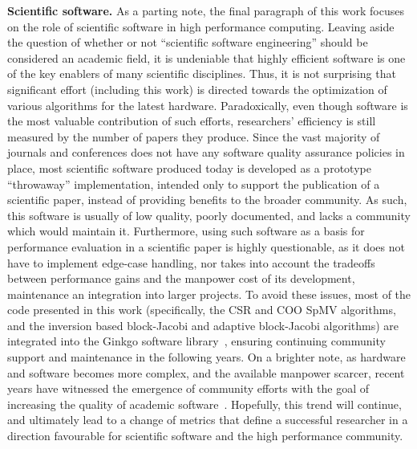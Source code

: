 \noindent\textbf{Scientific software.}
As a parting note, the final paragraph of this work focuses on the role of
scientific software in high performance computing. Leaving aside the question of
whether or not ``scientific software engineering'' should be considered an
academic field, it is undeniable that highly efficient software is one of the
key enablers of many scientific disciplines. Thus, it is not surprising that
significant effort (including this work) is directed towards the optimization of
various algorithms for the latest hardware. Paradoxically, even though software
is the most valuable contribution of such efforts, researchers' efficiency is
still measured by the number of papers they produce. Since the vast majority of
journals and conferences does not have any software quality assurance policies
in place, most scientific software produced today is developed as a prototype
``throwaway'' implementation, intended only to support the publication of a
scientific paper, instead of providing benefits to the broader community. As
such, this software is usually of low quality, poorly documented, and lacks a
community which would maintain it. Furthermore, using such software as a basis
for performance evaluation in a scientific paper is highly questionable, as it
does not have to implement edge-case handling, nor takes into account the
tradeoffs between performance gains and the manpower cost of its development,
maintenance an integration into larger projects. To avoid these issues, most of
the code presented in this work (specifically, the CSR and COO SpMV algorithms,
and the inversion based block-Jacobi and adaptive block-Jacobi algorithms) are
integrated into the Ginkgo software library~\cite{ginkgo}, ensuring continuing
community support and maintenance in the following years. On a brighter note, as
hardware and software becomes more complex, and the available manpower scarcer,
recent years have witnessed the emergence of community efforts with the goal of
increasing the quality of academic software~\cite{toms,xsdk,bssw,patch-contrib}.
Hopefully, this trend will continue, and ultimately lead to a change of metrics
that define a successful researcher in a direction favourable for scientific
software and the high performance community.
